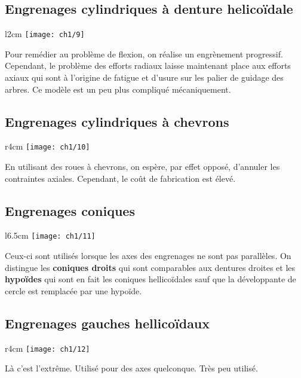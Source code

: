 \subsection{Engrenages cylindriques à denture helicoïdale}
\begin{wrapfigure}[5]{l}{2cm}
	\vspace{-5mm}
	\texttt{[image: ch1/9]}
\end{wrapfigure}	
\noindent Pour remédier au problème de flexion, on réalise un engrènement progressif. Cependant, le problème des efforts radiaux laisse maintenant place aux efforts axiaux qui sont à l'origine de fatigue et d'usure sur les palier de guidage des arbres. Ce modèle est un peu plus compliqué mécaniquement. \\
	
\subsection{Engrenages cylindriques à chevrons}
\begin{wrapfigure}[4]{r}{4cm}
	\vspace{-5mm}
	\texttt{[image: ch1/10]}
\end{wrapfigure}	
\noindent En utilisant des roues à chevrons, on espère, par effet opposé, d'annuler les contraintes axiales. Cependant, le coût de fabrication est élevé. \\
	
\subsection{Engrenages coniques}
\begin{wrapfigure}[6]{l}{6.5cm}
	\vspace{-5mm}
	\texttt{[image: ch1/11]}
\end{wrapfigure}	
\noindent Ceux-ci sont utilisés lorsque les axes des engrenages ne sont pas parallèles. On distingue les \textbf{coniques droits} qui sont comparables aux dentures droites et les \textbf{hypoïdes} qui sont en fait les coniques hellicoïdales sauf que la développante de cercle est remplacée par une hypoïde.
	
\subsection{Engrenages gauches hellicoïdaux}
\begin{wrapfigure}[2]{r}{4cm}
	\vspace{-5mm}
	\texttt{[image: ch1/12]}
\end{wrapfigure}	
\noindent Là c'est l'extrême. Utilisé pour des axes quelconque. Très peu utilisé. \\\\\\\\

